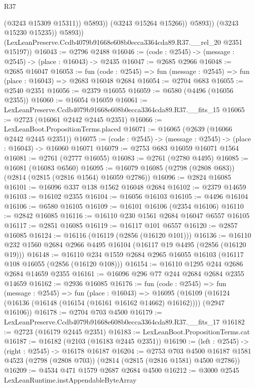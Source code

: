 \begin{lexlean}{R37}
\begin{coremodule}
                        (@3243 @15309 @15311))
                      @5893))
                  (@3243 @15264 @15266))
                @5893))
            (@3243 @15230 @15235))
          @5893))
      (LexLeanPreserve.Ccdb4079b91668e608b0ecca3364cda89.R37.__rel_20 @2351 @15197))
@16043 := @2796 @2488
@16046 := (code : @2545) -> (message : @2545) -> (place : @16043) -> @2435
@16047 := @2685 @2966
@16048 := @2685 @16047
@16053 := fun (code : @2545) => fun (message : @2545) => fun (place : @16043) => @2683 @16048 @2684
@16054 := @2704 @683
@16055 := @2540 @2351
@16056 := @2379 @16055
@16059 := @6580 (@4496 (@16056 @2355))
@16060 := @16054 @16059
@16061 := LexLeanPreserve.Ccdb4079b91668e608b0ecca3364cda89.R37.__fits_15
@16065 := @2723 (@16061 @2442 @2445 @2351)
@16066 := LexLeanBoot.PropositionTerms.placed
@16071 := @16065 (@2639 (@16066 @2442 @2445 @2351))
@16075 := (code : @2545) -> (message : @2545) -> (place : @16043) -> @16060 @16071
@16079 := @2753 @683 @16059 @16071 @1564
@16081 := @2761 (@2777 @16055)
@16083 := @2761 (@2780 @4495)
@16085 := @16081 (@16083 @6560)
@16095 := @16079 @16085 (@2798 (@2808 @683)) (@2814 (@2815 (@2816 @1564) @16059 @2786))
@16096 := @2824 @16085
@16101 := @16096 @337 @138 @1562 @16048 @2684
@16102 := @2379 @14659
@16103 := @16102 @2355
@16104 := @16056 @16103
@16105 := @4496 @16104
@16106 := @6580 @16105
@16109 := @16101 @16106 (@2354 @16106)
@16110 := @2842 @16085
@16116 := @16110 @230 @1561 @2684 @16047 @6557 @16105
@16117 := @2851 @16085
@16119 := @16117 @101 @6557
@16120 := @2857 @16085
@16124 := @16116 (@16119 (@2856 (@16120 @101)))
@16136 := @16110 @232 @1560 @2684 @2966 @4495 @16104 (@16117 @19 @4495 (@2856 (@16120 @19)))
@16148 := @16110 @234 @1559 @2684 @2965 @16055 @16103 (@16117 @108 @16055 (@2856 (@16120 @108)))
@16154 := @16110 @1295 @244 @2686 @2684 @14659 @2355
@16161 := @16096 @296 @77 @244 @2684 @2684 @2355 @14659
@16162 := @2936 @16085
@16176 := fun (code : @2545) =>
  fun (message : @2545) =>
  fun (place : @16043) =>
  @16095 (@16109 (@16124 (@16136 (@16148 (@16154 (@16161 @16162 @14662) @16162)))) (@2947 @16106))
@16178 := @2704 @703 @4500
@16179 := LexLeanPreserve.Ccdb4079b91668e608b0ecca3364cda89.R37.__fits_17
@16182 := @2723 (@16179 @2445 @2351)
@16183 := LexLeanBoot.PropositionTerms.cat
@16187 := @16182 (@2103 (@16183 @2445 @2351))
@16190 := (left : @2545) -> (right : @2545) -> @16178 @16187
@16204 := @2753
    @703
    @4500
    @16187
    @1581
    @4523
    (@2798 (@2808 @703))
    (@2814 (@2815 (@2816 @1581) @4500 @2786))
@16209 := @4534 @471 @1579 @2687 @2684 @4500
@16212 := @3000 @2545 LexLeanRuntime.instAppendableByteArray

\end{coremodule}
\end{lexlean}
